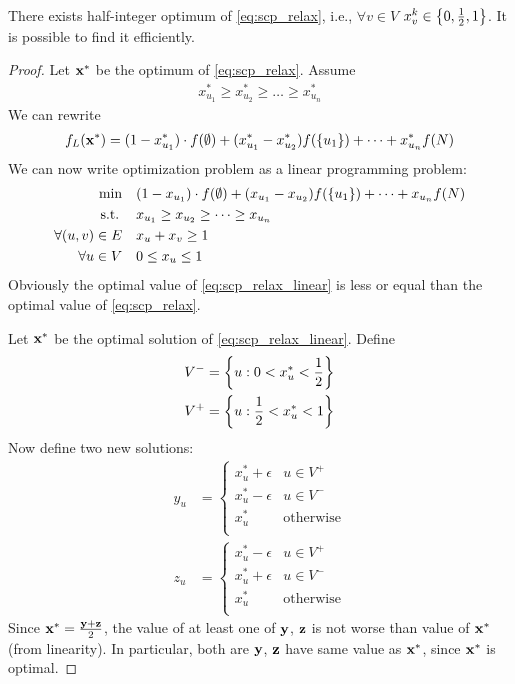 \begin{prop}
	There exists half-integer optimum of \vref{eq:scp_relax}, i.e., $\forall v\in V$ $x_v^k \in \qty{0,\frac{1}{2}, 1}$. It is possible to find it efficiently.
	\begin{proof}
		Let $\vb{x}^*$ be the optimum of \vref{eq:scp_relax}. Assume 
		\begin{align}
		x^*_{u_1} \geq x^*_{u_2} \geq \dots \geq x^*_{u_n}
		\end{align}
		We can rewrite
		\begin{align}
		f_L(\vb{x}^*) = (1-x^*_{u_1}) \cdot f(\emptyset) + (x^*_{u_1}-x^*_{u_2})f(\qty{u_1}) + \dots + x^*_{u_n} f(N)
		\end{align}
		We can now write optimization problem as a linear programming problem:
		\begin{align} \label{eq:scp_relax_linear}
		\min \quad&  (1-x_{u_1}) \cdot f(\emptyset) + (x_{u_1}-x_{u_2})f(\qty{u_1}) + \dots + x_{u_n} f(N) \\ 
		\text{s.t.} \:  \quad&x_{u_1} \geq x_{u_2} \geq \dots \geq x_{u_n} \\
		\forall (u,v)\in E \quad&x_u+x_v \geq 1 \\
		\forall u \in V \quad&0\leq x_u \leq 1 
		\end{align}
		Obviously the optimal value of \vref{eq:scp_relax_linear} is less or equal than the optimal value of \vref{eq:scp_relax}.
		
		Let $\vb{x}^*$ be the optimal solution of \vref{eq:scp_relax_linear}. Define
		\begin{align}
		V^- &= \qty{ u : 0 < x^*_u <\frac{1}{2} }\\
		V^+ &= \qty{ u : \frac{1}{2} < x^*_u <1 }\\
		\end{align}
		Now define two new solutions:
		\begin{align}
		y_u &= \begin{cases}
		x^*_u + \epsilon & u \in V^+\\
		x^*_u - \epsilon & u \in V^-\\
		x^*_u & \text{otherwise}\\
		\end{cases}\\
		z_u &= \begin{cases}
		x^*_u - \epsilon & u \in V^+\\
		x^*_u + \epsilon & u \in V^-\\
		x^*_u & \text{otherwise}\\
		\end{cases}
		\end{align}
		Since $\vb{x}^* = \frac{\vb{y}+\vb{z}}{2}$, the value of at least one of $\vb{y}$, $\vb{z}$ is not worse than value of $\vb{x}^*$ (from linearity). In particular, both are $\vb{y}$, $\vb{z}$ have same value as $\vb{x}^*$, since $\vb{x}^*$ is optimal.
		

\end{proof}
\end{prop}
